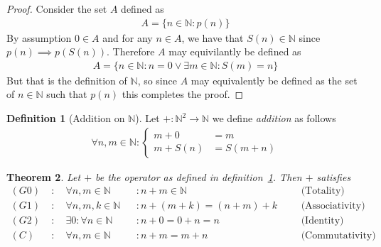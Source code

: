 \documentclass[a4paper,11pt]{article}
\theoremstyle{plain}
\newtheorem{theorem}{Theorem}
\theoremstyle{definition}
\newtheorem{definition}[theorem]{Definition}
\newcommand{\N}{\mathbb{N}}
\begin{document}
\begin{proof}
	Consider the set $A$ defined as
	\begin{align*}
		A=\{n\in\N:p(n)\}
	\end{align*}
	By assumption $0\in A$ and for any $n\in A$, we have that
	$S(n)\in\N$ since \newline$p(n)\implies p(S(n))$. Therefore $A$
	may equivilantly be defined as
	\begin{align*}
		A=\{n\in\N:n=0\lor\exists m\in\N:S(m)=n\}
	\end{align*}
	But that is the definition of $\N$, so since $A$ may equivalently
	be defined as the set of $n\in\N$ such that $p(n)$ this completes
	the proof.
\end{proof}
\begin{definition}[Addition on $\N$]\label{addition}
	Let $+:\N^2\rightarrow\N$ we define \textit{addition} as
	follows
	\begin{align*}
	\forall n,m\in\N:
	\begin{cases}
		m+0 & = m \\
		m+S(n) &= S(m+n)
	\end{cases}
	\end{align*}
\end{definition}
\begin{theorem}
	Let $+$ be the operator as defined in definition~\ref{addition}. Then $+$
	satisfies
	\begin{align*}
		(G0)\; &:\quad \forall n,m\in\N &&:n+m\in\N 
		&&&\text{(Totality)}\\
		(G1)\; &:\quad \forall n,m,k\in\N&&:n+(m+k)=(n+m)+k
		&&&\text{(Associativity)}\\
		(G2)\; &:\quad \exists 0:\forall n\in\N &&: n+0=0+n=n 
		&&&\text{(Identity)}\\
		(C)\; &:\quad \forall n,m\in\N &&: n+m=m+n
		&&&\text{(Commutativity)}\\
	\end{align*}
\end{theorem}
\end{document}
